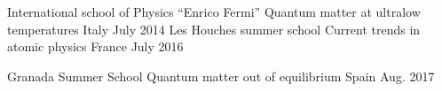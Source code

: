 \begin{cvhonors}
  \cvhonor
    {International school of Physics “Enrico Fermi”}
    {Quantum matter at ultralow temperatures}
    {Italy}
    {July 2014}
  \cvhonor
    {Les Houches summer school}
    {Current trends in atomic physics}
    {France}
    {July 2016}
    
  \cvhonor
    {Granada Summer School}
    {Quantum matter out of equilibrium}
    {Spain}
    {Aug. 2017}
\end{cvhonors}
